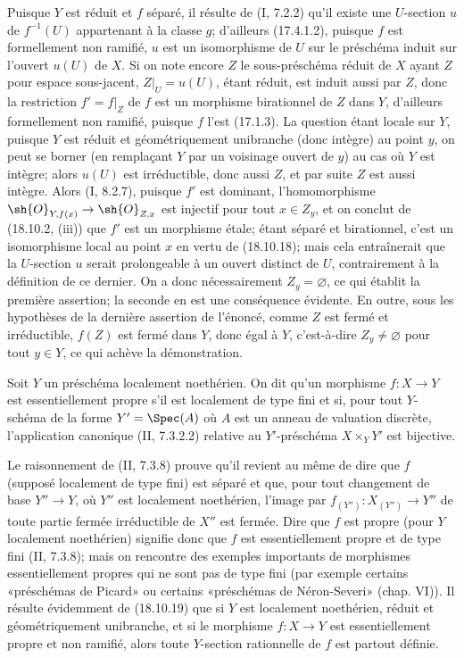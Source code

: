 Puisque $Y$ est réduit et $f$ séparé, il résulte de (I, 7.2.2) qu'il existe une $U$-section $u$ de $f^{-1}(U)$ appartenant à la classe $g$; d'ailleurs (17.4.1.2), puisque $f$ est formellement non ramifié, $u$ est un isomorphisme de $U$ sur le préschéma induit sur l'ouvert $u(U)$ de $X$. Si on note encore $Z$ le sous-préschéma réduit de $X$ ayant $Z$ pour espace sous-jacent, $Z|_U=u(U)$, étant réduit, est induit aussi par $Z$, donc la restriction $f'=f|_Z$ de $f$ est un morphisme birationnel de $Z$ dans $Y$, d'ailleurs formellement non ramifié, puisque $f$ l'est (17.1.3). La question étant locale sur $Y$, puisque $Y$ est réduit et géométriquement unibranche (donc intègre) au point $y$, on peut se borner (en remplaçant $Y$ par un voisinage ouvert de $y$) au cas où $Y$ est intègre; alors $u(U)$ est irréductible, donc aussi $Z$, et par suite $Z$ est aussi intègre. Alors (I, 8.2.7), puisque $f'$ est dominant, l'homomorphisme $\sh{O}_{Y,f(x)}\to\sh{O}_{Z,x}$ est injectif pour tout $x\in Z_y$, et on conclut de (18.10.2, (iii)) que $f'$ est un morphisme étale; étant séparé et birationnel, c'est un isomorphisme local au point $x$ en vertu de (18.10.18); mais cela entraînerait que la $U$-section $u$ serait prolongeable à un ouvert distinct de $U$, contrairement à la définition de ce dernier. On a donc nécessairement $Z_y=\varnothing$, ce qui établit la première assertion; la seconde en est une conséquence évidente. En outre, sous les hypothèses de la dernière assertion de l'énoncé, comme $Z$ est fermé et irréductible, $f(Z)$ est fermé dans $Y$, donc égal à $Y$, c'est-à-dire $Z_y\ne\varnothing$ pour tout $y\in Y$, ce qui achève la démonstration.

\begin{remark}[18.10.20]
Soit $Y$ un préschéma localement noethérien. On dit qu'un morphisme $f:X\to Y$ est essentiellement propre s'il est localement de type fini et si, pour tout $Y$-schéma de la forme $Y'=\Spec(A)$ où $A$ est un anneau de valuation discrète, l'application canonique (II, 7.3.2.2) relative au $Y'$-préschéma $X\times_Y Y'$ est bijective.


Le raisonnement de (II, 7.3.8) prouve qu'il revient au même de dire que $f$ (supposé localement de type fini) est séparé et que, pour tout changement de base $Y''\to Y$, où $Y''$ est localement noethérien, l'image par $f_{(Y'')}:X_{(Y'')}\to Y''$ de toute partie fermée irréductible de $X''$ est fermée. Dire que $f$ est propre (pour $Y$ localement noethérien) signifie donc que $f$ est essentiellement propre et de type fini (II, 7.3.8); mais on rencontre des exemples importants de morphismes essentiellement propres qui ne sont pas de type fini (par exemple certains «préschémas de Picard» ou certains «préschémas de Néron-Severi» (chap. VI)). Il résulte évidemment de (18.10.19) que si $Y$ est localement noethérien, réduit et géométriquement unibranche, et si le morphisme $f:X\to Y$ est essentiellement propre et non ramifié, alors toute $Y$-section rationnelle de $f$ est partout définie.
\end{remark}

